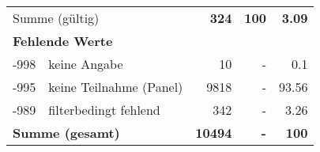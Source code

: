 \begin{longtable}{lXrrr}
     \midrule
     \multicolumn{2}{l}{Summe (gültig)} &
       \textbf{\num{324}} &
     \textbf{\num{100}} &
       \textbf{\num[round-mode=places,round-precision=2]{3.09}} \\
     \multicolumn{5}{l}{\textbf{Fehlende Werte}}\\
       -998 &
       keine Angabe &
         \num{10} &
        - &
         \num[round-mode=places,round-precision=2]{0.1} \\
       -995 &
       keine Teilnahme (Panel) &
         \num{9818} &
        - &
         \num[round-mode=places,round-precision=2]{93.56} \\
       -989 &
       filterbedingt fehlend &
         \num{342} &
        - &
         \num[round-mode=places,round-precision=2]{3.26} \\
     \midrule
     \multicolumn{2}{l}{\textbf{Summe (gesamt)}} &
          \textbf{\num{10494}} &
        \textbf{-} &
        \textbf{\num{100}} \\
     \bottomrule
     \end{longtable}
     
